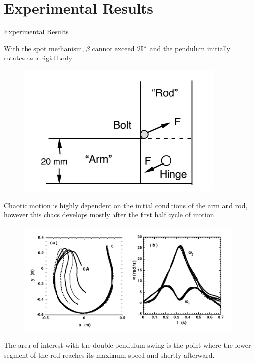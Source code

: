 \documentclass[tikz]{beamer}
\begin{document}
\section{Experimental Results}
\begin{frame} {Experimental Results}
	
	 {
		With the spot mechanism, $\beta$ cannot exceed $90 \degree$ and the pendulum initially rotates as a rigid body
		\begin{figure}
			\centering
			\includegraphics[scale=0.5]{stopmechanism.png}
		\end{figure}
	}

	 {
		Chaotic motion is highly dependent on the initial conditions of the arm and rod, however this chaos develops mostly after the first half cycle of motion.
		\begin{figure}
			\centering
			\includegraphics[scale=0.5]{trajectory.png}
		\end{figure}

		The area of interest with the double pendulum swing is the point where the lower segment of the rod reaches its maximum speed and shortly afterward.
	}


\end{frame}
\end{document}
